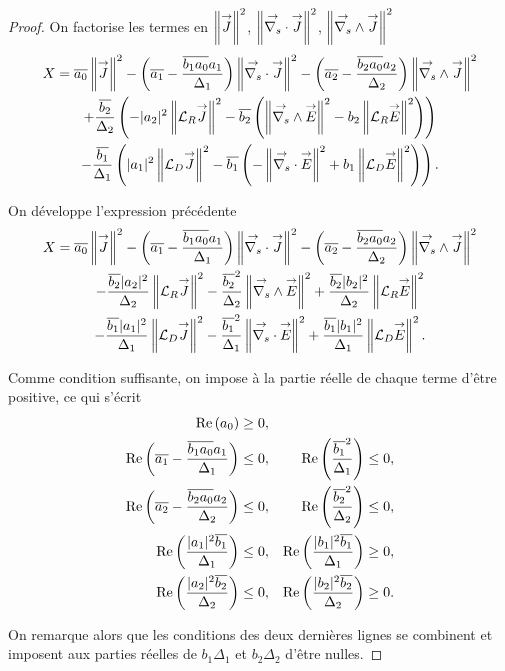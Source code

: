\begin{proof}
    On factorise les termes en \(\norm{\vJ}^2\), \(\norm{\vdivs\vJ}^2\),  \(\norm{\vrots\vJ}^2\)
    \begin{multline*}
      X = \conj{a_0} \norm{\vJ }^2 - \left(\conj{a_1} - \frac{\conj{b_1a_0}a_1}{\Delta_1}\right) \norm{\vdivs \vJ}^2 - \left(\conj{a_2} - \frac{\conj{b_2a_0}a_2}{\Delta_2}\right) \norm{\vrots \vJ }^2
      \\
      + \frac{\conj{b_2}}{\Delta_2}\left( - |a_2|^2\norm{\LR \vJ}^2  - \conj{b_2}\left(\norm{\vrots\vE}^2 - b_2 \norm{\LR \vE }^2\right)\right) 
      \\
      - \frac{\conj{b_1}}{\Delta_1}\left( |a_1|^2\norm{\LD \vJ}^2  - \conj{b_1}\left(-\norm{\vdivs\vE}^2 + b_1 \norm{\LD \vE }^2\right)\right).
    \end{multline*}

    On développe l'expression précédente
    \begin{multline*}
      X = \conj{a_0} \norm{\vJ }^2 - \left(\conj{a_1} - \frac{\conj{b_1a_0}a_1}{\Delta_1}\right) \norm{\vdivs \vJ }^2 - \left(\conj{a_2} - \frac{\conj{b_2a_0}a_2}{\Delta_2}\right) \norm{\vrots \vJ }^2
      \\
      - \frac{\conj{b_2}|a_2|^2}{\Delta_2}\norm{\LR \vJ}^2  -  \frac{\conj{b_2}^2}{\Delta_2}\norm{\vrots\vE}^2 +  \frac{\conj{b_2}|b_2|^2}{\Delta_2} \norm{\LR \vE }^2
      \\
      - \frac{\conj{b_1}|a_1|^2}{\Delta_1}\norm{\LD \vJ}^2  - \frac{\conj{b_1}^2}{\Delta_1}\norm{\vdivs\vE}^2 + \frac{\conj{b_1}|b_1|^2}{\Delta_1} \norm{\LD \vE }^2.
    \end{multline*}

    Comme condition suffisante, on impose à la partie réelle de chaque terme d'être positive, ce qui s'écrit
    \begin{align*}
      \Re\left(a_0\right)\ge 0, && 
      \\
      \Re\left(\conj{a_1} - \frac{\conj{b_1a_0}a_1}{\Delta_1}\right) \le 0, && \Re\left(\frac{\conj{b_1}^2}{\Delta_1}\right) \le 0,
      \\
      \Re\left(\conj{a_2} - \frac{\conj{b_2a_0}a_2}{\Delta_2}\right) \le 0, && \Re\left(\frac{\conj{b_2}^2}{\Delta_2}\right) \le 0,
      \\
      \Re\left(\frac{|a_1|^2\conj{b_1}}{\Delta_1}\right) \le 0, && \Re\left(\frac{|b_1|^2\conj{b_1}}{\Delta_1}\right) \ge 0,
      \\
      \Re\left(\frac{|a_2|^2\conj{b_2}}{\Delta_2}\right) \le 0, && \Re\left(\frac{|b_2|^2\conj{b_2}}{\Delta_2}\right) \ge 0.
    \end{align*}


    On remarque alors que les conditions des deux dernières lignes se combinent et imposent aux parties réelles de \(b_1\Delta_1\) et \(b_2\Delta_2\) d'être nulles.
  \end{proof}

